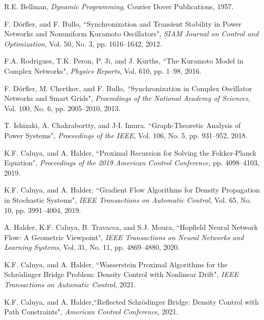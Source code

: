 \documentclass[10pt,twocolumn]{IEEEtran}
\begin{document}
\begin{thebibliography}{99}
R.E. Bellman, \emph{Dynamic Programming}, Courier Dover Publications, 1957.


F. D\"{o}rfler, and F. Bullo, ``Synchronization and Transient Stability in Power Networks and Nonuniform Kuramoto Oscillators", \emph{SIAM Journal on Control and Optimization}, Vol. 50, No. 3, pp. 1616--1642, 2012.

F.A. Rodrigues, T.K. Peron, P. Ji, and J. Kurths, ``The Kuramoto Model in Complex Networks", \emph{Physics Reports}, Vol. 610, pp. 1--98, 2016.

F. D{\"o}rfler, M. Chertkov, and F. Bullo, ``Synchronization in Complex Oscillator Networks and Smart Grids", \emph{Proceedings of the National Academy of Sciences}, Vol. 100, No. 6, pp. 2005--2010, 2013.

T. Ishizaki, A. Chakrabortty, and J-I. Imura. ``Graph-Theoretic Analysis of Power Systems", \emph{Proceedings of the IEEE}, Vol. 106, No. 5, pp. 931--952, 2018.


K.F. Caluya, and A. Halder, ``Proximal Recursion for Solving the Fokker-Planck Equation", \emph{Proceedings of the 2019 American Control Conference}, pp. 4098--4103, 2019.

K.F. Caluya, and A. Halder, ``Gradient Flow Algorithms for Density Propagation in Stochastic Systems", \emph{IEEE Transactions on Automatic Control}, Vol. 65, No. 10, pp. 3991--4004, 2019.

A. Halder, K.F. Caluya, B. Travacca, and S.J. Moura, ``Hopfield Neural Network Flow: A Geometric Viewpoint", \emph{IEEE Transactions on Neural Networks and Learning Systems}, Vol. 31, No. 11, pp. 4869--4880, 2020. 


K.F. Caluya, and A. Halder, ``Wasserstein Proximal Algorithms for the Schr\"{o}dinger Bridge Problem: Density Control with Nonlinear Drift", \emph{IEEE Transactions on Automatic Control}, 2021.

K.F. Caluya, and A. Halder,``Reflected Schr\"{o}dinger Bridge: Density Control with Path Constraints", \emph{American Control Conference}, 2021.



\end{thebibliography}
\end{document}
